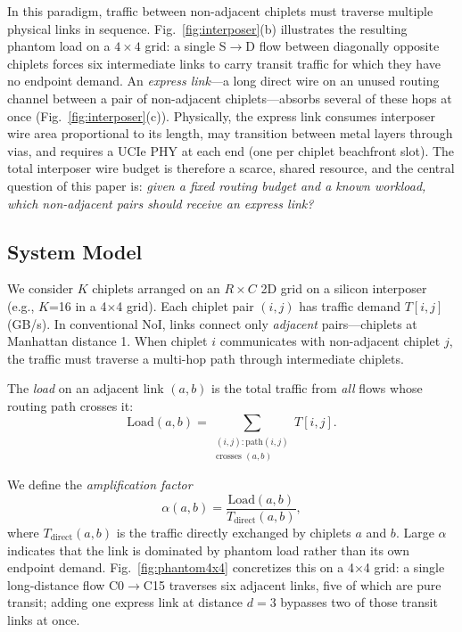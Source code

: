 \documentclass[conference]{IEEEtran}
\begin{document}
In this paradigm, traffic between non-adjacent chiplets must traverse multiple physical links in sequence. Fig.~\ref{fig:interposer}(b) illustrates the resulting phantom load on a $4\times 4$ grid: a single S$\to$D flow between diagonally opposite chiplets forces six intermediate links to carry transit traffic for which they have no endpoint demand. An \textit{express link}---a long direct wire on an unused routing channel between a pair of non-adjacent chiplets---absorbs several of these hops at once (Fig.~\ref{fig:interposer}(c)). Physically, the express link consumes interposer wire area proportional to its length, may transition between metal layers through vias, and requires a UCIe PHY at each end (one per chiplet beachfront slot). The total interposer wire budget is therefore a scarce, shared resource, and the central question of this paper is: \textit{given a fixed routing budget and a known workload, which non-adjacent pairs should receive an express link?}

\subsection{System Model}

We consider $K$ chiplets arranged on an $R \times C$ 2D grid on a silicon interposer (e.g., $K$=16 in a 4$\times$4 grid). Each chiplet pair $(i,j)$ has traffic demand $T[i,j]$ (GB/s). In conventional NoI, links connect only \textit{adjacent} pairs---chiplets at Manhattan distance 1. When chiplet $i$ communicates with non-adjacent chiplet $j$, the traffic must traverse a multi-hop path through intermediate chiplets.

The \textit{load} on an adjacent link $(a,b)$ is the total traffic from \textit{all} flows whose routing path crosses it:
\begin{equation}
\text{Load}(a,b) = \sum_{\substack{(i,j): \text{path}(i,j) \\ \text{crosses } (a,b)}} T[i,j].
\end{equation}

We define the \textit{amplification factor}
\begin{equation}
\alpha(a,b) = \frac{\text{Load}(a,b)}{T_{\text{direct}}(a,b)},
\end{equation}
where $T_{\text{direct}}(a,b)$ is the traffic directly exchanged by chiplets $a$ and $b$. Large $\alpha$ indicates that the link is dominated by phantom load rather than its own endpoint demand. Fig.~\ref{fig:phantom4x4} concretizes this on a 4$\times$4 grid: a single long-distance flow C0$\to$C15 traverses six adjacent links, five of which are pure transit; adding one express link at distance $d=3$ bypasses two of those transit links at once.
\end{document}
